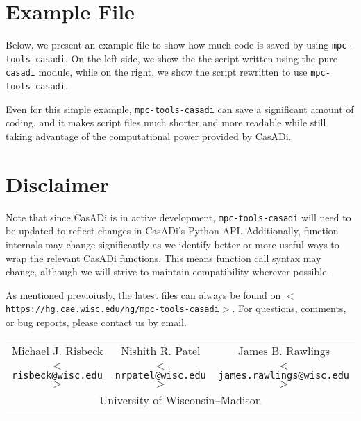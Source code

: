 \documentclass{article}
\newcommand{\smallurl}[2][\scriptsize]{\texttt{#1$<$#2$>$}}
\newcommand{\casadi}{CasADi}
\begin{document}
\section{Example File}

Below, we present an example file to show how much code is saved by using \texttt{mpc-tools-casadi}.
On the left side, we show the the script written using the pure \texttt{casadi} module, while on the right, we show the script rewritten to use \texttt{mpc-tools-casadi}.

\hspace{1em}



Even for this simple example, \texttt{mpc-tools-casadi} can save a significant amount of coding, and it makes script files much shorter and more readable while still taking advantage of the computational power provided by \casadi{}.

\section{Disclaimer}

Note that since \casadi{} is in active development, \texttt{mpc-tools-casadi} will need to be updated to reflect changes in \casadi{}'s Python API.
Additionally, function internals may change significantly as we identify better or more useful ways to wrap the relevant \casadi{} functions.
This means function call syntax may change, although we will strive to maintain compatibility wherever possible.

As mentioned previoiusly, the latest files can always be found on \smallurl{https://hg.cae.wisc.edu/hg/mpc-tools-casadi}.
For questions, comments, or bug reports, please contact us by email.

\begin{center}
\begin{tabular}{ccc}
    Michael J. Risbeck & Nishith R. Patel & James B. Rawlings \\
    \smallurl[\small]{risbeck@wisc.edu} & \smallurl[\small]{nrpatel@wisc.edu} & \smallurl[\small]{james.rawlings@wisc.edu} \\
    \multicolumn{3}{c}{University of Wisconsin--Madison} \\
    \hspace*{.2\textwidth} & \hspace*{.2\textwidth} & \hspace*{.2\textwidth} %
\end{tabular}
\end{center}
\end{document}
